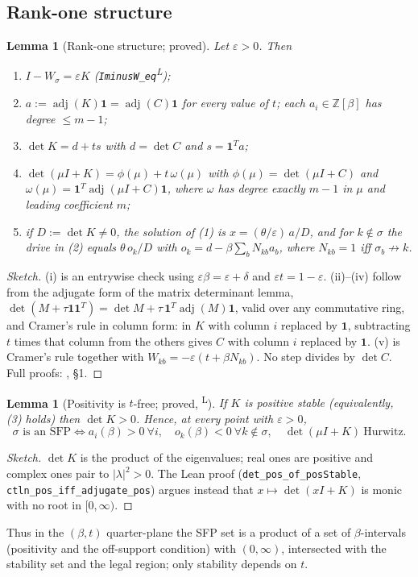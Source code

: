 \documentclass[11pt]{article}
\newtheorem{lemma}[theorem]{Lemma}
\theoremstyle{definition}
\newcommand{\one}{\mathbf{1}}
\newcommand{\eps}{\varepsilon}
\newcommand{\adj}{\operatorname{adj}}
\newcommand{\lean}{\textsuperscript{\textsf{L}}}
\begin{document}
\subsection{Rank-one structure}
\begin{lemma}[Rank-one structure; proved]\label{lem:rankone}
Let $\eps>0$. Then
\begin{enumerate}
\item[(i)] $I-W_\sigma=\eps K$ (\texttt{IminusW\_eq}\lean);
\item[(ii)] $a:=\adj(K)\one=\adj(C)\one$ for every value of $t$; each $a_i\in\mathbb Z[\beta]$ has degree $\le m-1$;
\item[(iii)] $\det K=d+ts$ with $d=\det C$ and $s=\one^Ta$;
\item[(iv)] $\det(\mu I+K)=\phi(\mu)+t\,\omega(\mu)$ with $\phi(\mu)=\det(\mu I+C)$ and
$\omega(\mu)=\one^T\adj(\mu I+C)\one$, where $\omega$ has degree exactly $m-1$ in $\mu$ and leading coefficient $m$;
\item[(v)] if $D:=\det K\ne0$, the solution of (1) is $x=(\theta/\eps)\,a/D$, and for $k\notin\sigma$ the
drive in (2) equals $\theta\, o_k/D$ with $o_k=d-\beta\sum_b N_{kb}a_b$, where $N_{kb}=1$ iff $\sigma_b\not\to k$.
\end{enumerate}
\end{lemma}
\begin{proof}[Sketch]
(i) is an entrywise check using $\eps\beta=\eps+\delta$ and $\eps t=1-\eps$. (ii)--(iv) follow from the
adjugate form of the matrix determinant lemma, $\det(M+\tau\one\one^T)=\det M+\tau\,\one^T\adj(M)\one$,
valid over any commutative ring, and Cramer's rule in column form: in $K$ with column $i$ replaced by
$\one$, subtracting $t$ times that column from the others gives $C$ with column $i$ replaced by $\one$.
(v) is Cramer's rule together with $W_{kb}=-\eps(t+\beta N_{kb})$. No step divides by $\det C$.
Full proofs: , \S1.
\end{proof}

\begin{lemma}[Positivity is $t$-free; proved, \lean]\label{lem:A2}
If $K$ is positive stable (equivalently, (3) holds) then $\det K>0$. Hence, at every point with $\eps>0$,
\[
\sigma\text{ is an SFP}\iff a_i(\beta)>0\ \forall i,\quad o_k(\beta)<0\ \forall k\notin\sigma,\quad
\det(\mu I+K)\ \text{Hurwitz}.
\]
\end{lemma}
\begin{proof}[Sketch]
$\det K$ is the product of the eigenvalues; real ones are positive and complex ones pair to
$|\lambda|^2>0$. The Lean proof (\texttt{det\_pos\_of\_posStable}, \texttt{ctln\_pos\_iff\_adjugate\_pos})
argues instead that $x\mapsto\det(xI+K)$ is monic with no root in $[0,\infty)$.
\end{proof}
Thus in the $(\beta,t)$ quarter-plane the SFP set is a product of a set of $\beta$-intervals (positivity
and the off-support condition) with $(0,\infty)$, intersected with the stability set and the legal
region; only stability depends on $t$.
\end{document}

